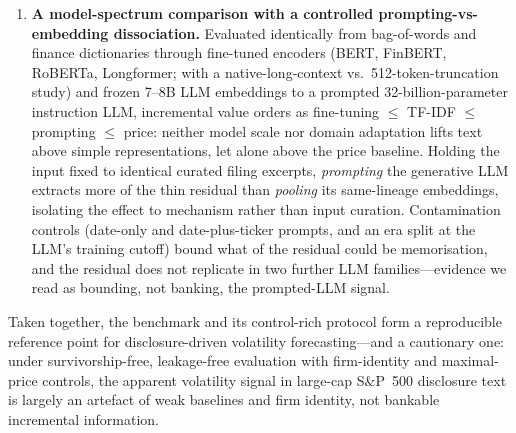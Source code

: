 \begin{enumerate}
  \item \textbf{A model-spectrum comparison with a controlled prompting-vs-embedding dissociation.} Evaluated identically from bag-of-words and finance dictionaries through fine-tuned encoders (BERT, FinBERT, RoBERTa, Longformer; with a native-long-context vs.\ 512-token-truncation study) and frozen 7--8B LLM embeddings to a prompted 32-billion-parameter instruction LLM, incremental value orders as fine-tuning $\le$ TF-IDF $\le$ prompting $\le$ price: neither model scale nor domain adaptation lifts text above simple representations, let alone above the price baseline. Holding the input fixed to identical curated filing excerpts, \emph{prompting} the generative LLM extracts more of the thin residual than \emph{pooling} its same-lineage embeddings, isolating the effect to mechanism rather than input curation. Contamination controls (date-only and date-plus-ticker prompts, and an era split at the LLM's training cutoff) bound what of the residual could be memorisation, and the residual does not replicate in two further LLM families---evidence we read as bounding, not banking, the prompted-LLM signal.
\end{enumerate}

\noindent Taken together, the benchmark and its control-rich protocol form a reproducible reference point for disclosure-driven volatility forecasting---and a cautionary one: under survivorship-free, leakage-free evaluation with firm-identity and maximal-price controls, the apparent volatility signal in large-cap S\&P~500 disclosure text is largely an artefact of weak baselines and firm identity, not bankable incremental information.
